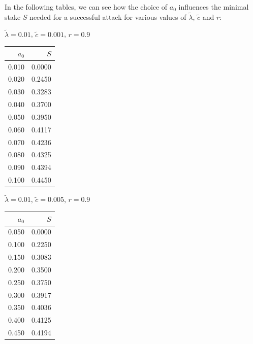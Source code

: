 \documentclass[11pt,a4paper]{article}
\begin{document}
In the following tables, we can see how the choice of \(a_0\) influences
the minimal stake \(S\) needed for a successful attack for various
values of \(\tilde{\lambda}\), \(\tilde{c}\) and \(r\):

\begin{minipage}[t]{\textwidth}
    \begin{minipage}[t]{0.32\textwidth}
        \footnotesize
        \begin{flushleft}$\tilde{\lambda}=0.01$, $\tilde{c}=0.001$, $r=0.9$\end{flushleft}
        \begin{tabular}[t]{rr}
            $a_0$ & $S$ \\
            \hline
             0.010 & 0.0000 \\
             0.020 & 0.2450 \\
             0.030 & 0.3283 \\
             0.040 & 0.3700 \\
             0.050 & 0.3950 \\
             0.060 & 0.4117 \\
             0.070 & 0.4236 \\
             0.080 & 0.4325 \\
             0.090 & 0.4394 \\
             0.100 & 0.4450 \\
        \end{tabular}
    \end{minipage}
    \begin{minipage}[t]{0.32\textwidth}
        \footnotesize
        \begin{flushleft}$\tilde{\lambda}=0.01$, $\tilde{c}=0.005$, $r=0.9$\end{flushleft}
        \begin{tabular}[t]{rr}
            $a_0$ & $S$ \\
            \hline
             0.050 & 0.0000 \\
             0.100 & 0.2250 \\
             0.150 & 0.3083 \\
             0.200 & 0.3500 \\
             0.250 & 0.3750 \\
             0.300 & 0.3917 \\
             0.350 & 0.4036 \\
             0.400 & 0.4125 \\
             0.450 & 0.4194 \\

\end{tabular}
\end{minipage}
\end{minipage}
\end{document}
